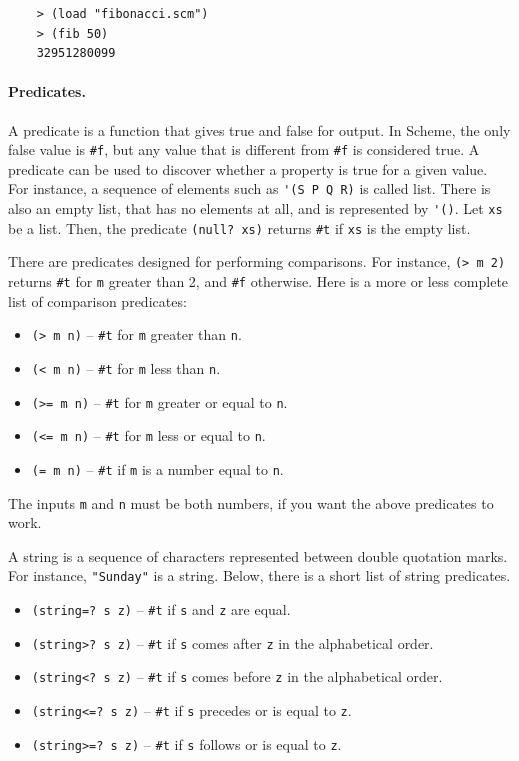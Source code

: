 \documentclass[a4paper,12pt]{book}
\newenvironment{fmpage}[1]
{\begin{lrbox}{\fmbox}\begin{minipage}{#1}}
{\end{minipage}\end{lrbox}\fbox{\usebox{\fmbox}}}
\begin{document}
\begin{fmpage}{0.9\linewidth}
	\begin{verbatim}
	> (load "fibonacci.scm")
	> (fib 50)
	32951280099
	\end{verbatim}
\end{fmpage}



\paragraph{Predicates.} A predicate
is a function that gives
true and false for output. In Scheme,
the only false value is \verb|#f|, but
any value that is different from \verb|#f|
is considered true. A predicate can be used to discover
whether a property is true for a given value.
For instance, a sequence of elements
such as \verb|'(S P Q R)| is called
list. There is also an empty list,
that has no elements at all, and
is represented by \verb|'()|. Let
\verb|xs| be a list. Then, the predicate
\verb|(null? xs)| returns \verb|#t|
if \verb|xs| is the empty list.

There are predicates designed for
performing comparisons. For instance,
\verb|(> m 2)| returns \verb|#t| for
\verb|m| greater than 2, and \verb|#f|
otherwise. Here is a more or less complete
list of comparison predicates:
\begin{itemize}
	\item\verb|(> m n)| -- \verb|#t| for
		\verb|m| greater than \verb|n|.
	\item\verb|(< m n)| -- \verb|#t| for
		\verb|m| less than \verb|n|.
	\item\verb|(>= m n)| -- \verb|#t| for
		\verb|m| greater or equal to \verb|n|.
	\item\verb|(<= m n)| -- \verb|#t| for
		\verb|m| less or equal to \verb|n|.
	\item\verb|(= m n)| -- \verb|#t| if
		\verb|m| is a number equal to \verb|n|.
\end{itemize}
The inputs \verb|m| and \verb|n| must
be both numbers, if you want
the above predicates to work.


A string is a sequence of characters
represented between double quotation
marks. For instance, \verb|"Sunday"|
is a string. Below, there is a short
list of string predicates.
\begin{itemize}
	\item\verb|(string=? s z)| -- \verb|#t|
		if \verb|s| and \verb|z| are equal.
	\item\verb|(string>? s z)| -- \verb|#t|
		if \verb|s|  comes
		after \verb|z| in the alphabetical order.
	\item\verb|(string<? s z)| -- \verb|#t|
		if \verb|s| comes before \verb|z|
		in the alphabetical order.
	\item\verb|(string<=? s z)| -- \verb|#t| if
		\verb|s| precedes or is equal to \verb|z|.
	\item\verb|(string>=? s z)| -- \verb|#t| if
		\verb|s| follows or is equal to \verb|z|.
\end{itemize}
\end{document}
